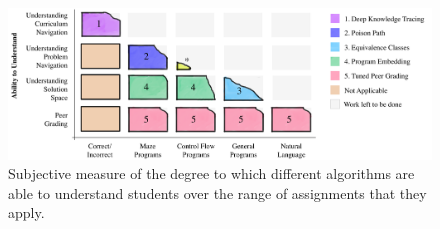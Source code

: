 \begin{figure}[t]
\center
   \includegraphics[width=1.0\textwidth]{img/intro-blocks.pdf}
\caption[Subjective contribution overview]{
Subjective measure of the degree to which different algorithms are able to understand students over the range of assignments that they apply.}
\label{fig:bigPicture}

\end{figure}

